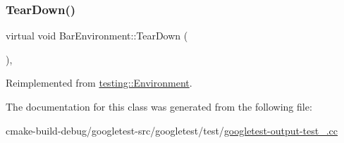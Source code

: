 \mbox{\label{classBarEnvironment_a384f951da72a2a18bb0c2b3506376b09}} 
\subsubsection{\texorpdfstring{TearDown()}{TearDown()}}
{\footnotesize\ttfamily virtual void Bar\+Environment\+::\+Tear\+Down (\begin{DoxyParamCaption}{ }\end{DoxyParamCaption})\hspace{0.3cm}{\ttfamily [inline]}, {\ttfamily [virtual]}}



Reimplemented from \mbox{\hyperlink{classtesting_1_1Environment_a039bdaa705c46b9b88234cf4d3bb6254}{testing\+::\+Environment}}.



The documentation for this class was generated from the following file\+:\begin{DoxyCompactItemize}
\item 
cmake-\/build-\/debug/googletest-\/src/googletest/test/\mbox{\hyperlink{googletest-output-test___8cc}{googletest-\/output-\/test\+\_\+.\+cc}}\end{DoxyCompactItemize}
